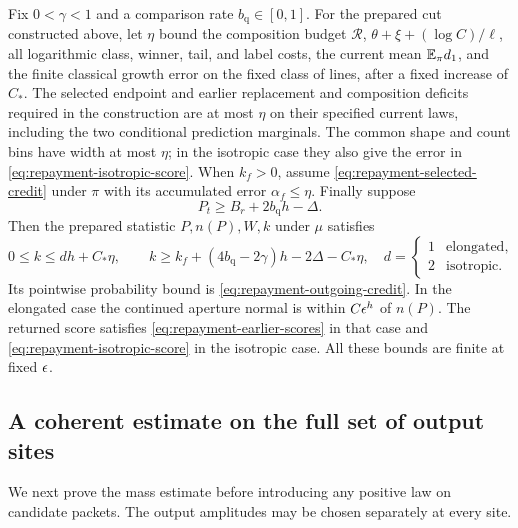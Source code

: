 \begin{proposition}
\label{prop:finite-repayment}
Fix \(0<\gamma<1\) and a comparison rate
\(b_{\mathrm q}\in[0,1]\).  For the prepared cut constructed above,
let \(\eta\) bound the composition budget \(\mathcal R\),
\(\theta+\xi+(\log C)/\ell\), all logarithmic class, winner, tail,
and label costs, the current mean \(\mathbb E_\pi d_1\), and the finite
classical growth error on the fixed class of lines, after a fixed
increase of \(C_*\).  The selected endpoint and earlier replacement
and composition deficits required in the construction are at most
\(\eta\) on their specified current laws, including the two
conditional prediction marginals.  The common shape and count bins
have width at most \(\eta\); in the isotropic case they also give
the error in \eqref{eq:repayment-isotropic-score}.
When \(k_f>0\), assume \eqref{eq:repayment-selected-credit} under
\(\pi\) with its accumulated error \(\alpha_f\le\eta\).
Finally suppose
\begin{equation}
 P_t\ge B_r+2b_{\mathrm q}h-\Delta .
 \label{eq:repayment-saturation-input}
\end{equation}
Then the prepared statistic \(P,n(P),W,k\) under \(\mu\) satisfies
\begin{equation}
 0\le k\le d h+C_*\eta,\qquad
 k\ge k_f+(4b_{\mathrm q}-2\gamma)h-2\Delta-C_*\eta,
 \quad
 d=\begin{cases}1&\text{elongated},\\2&\text{isotropic}.
                 \end{cases}
 \label{eq:finite-packet-repayment}
\end{equation}
Its pointwise probability bound is
\eqref{eq:repayment-outgoing-credit}.  In the elongated case the
continued aperture normal is within \(C\epsilon^h\) of \(n(P)\).
The returned score satisfies \eqref{eq:repayment-earlier-scores}
in that case and \eqref{eq:repayment-isotropic-score} in the
isotropic case.  All these bounds are finite at fixed \(\epsilon\).
\end{proposition}

\subsection{A coherent estimate on the full set of output sites}

We next prove the mass estimate before introducing any positive law
on candidate packets.  The output amplitudes may be chosen separately
at every site.

